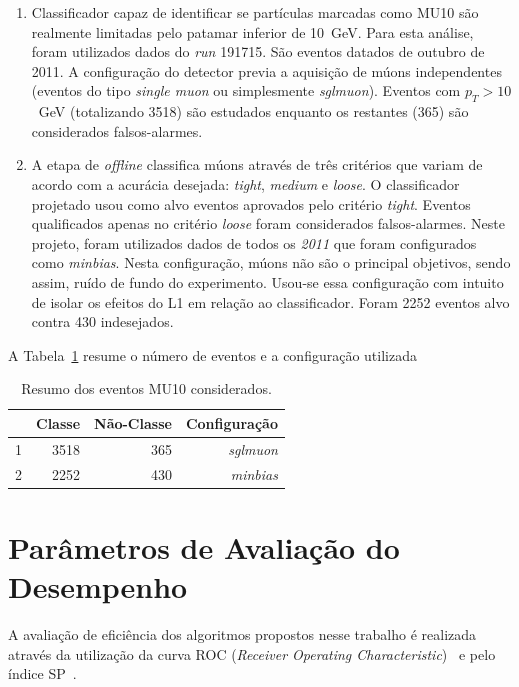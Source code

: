 \begin{enumerate}
    \item Classificador capaz de identificar se partículas marcadas como MU10 são
    realmente limitadas pelo patamar inferior de 10~GeV. Para esta análise, foram
    utilizados dados do \emph{run} 191715. São eventos datados de outubro de 2011. A
    configuração do detector previa a aquisição de múons independentes (eventos do
    tipo \emph{single muon} ou simplesmente \emph{sglmuon}). Eventos com $p_T >
    10$~GeV (totalizando 3518) são estudados enquanto os restantes (365) são
    considerados falsos-alarmes.

    \item A etapa de  \emph{offline} classifica múons através de três critérios
    que variam de acordo com a acurácia desejada: \emph{tight}, \emph{medium} e
    \emph{loose}. O classificador projetado usou como alvo eventos aprovados
    pelo critério \emph{tight}. Eventos qualificados apenas no critério
    \emph{loose} foram considerados falsos-alarmes.  Neste projeto, foram
    utilizados dados de todos os \emph{2011} que foram configurados como
    \emph{minbias}. Nesta configuração, múons não são o principal objetivos,
    sendo assim, ruído de fundo do experimento. Usou-se essa configuração com
    intuito de isolar os efeitos do L1 em  relação ao classificador. Foram 2252
    eventos alvo contra
    430 indesejados.

\end{enumerate}

A Tabela~\ref{table:Classes} resume o número de eventos e a configuração
utilizada

\begin{table}[htbp!]
  \centering
  \begin{tabular}{ l  r  r  r  }
      \toprule
                         & Classe & Não-Classe & Configuração\\
      \midrule
        1 & 3518  & 365 & \emph{sglmuon} \\
        2 & 2252 & 430 &  \emph{minbias} \\ 
      \bottomrule
  \end{tabular}
  \caption{Resumo dos eventos MU10 considerados.}
  \label{table:Classes}

\end{table}



\section{Parâmetros de Avaliação do Desempenho}
\label{sec:performance_indexes}
A avaliação de eficiência dos algoritmos propostos nesse trabalho é realizada
através da utilização da curva ROC (\emph{Receiver Operating
Characteristic})~\cite{TREES2001} e pelo índice SP~\cite{ref:SIMAS}.

